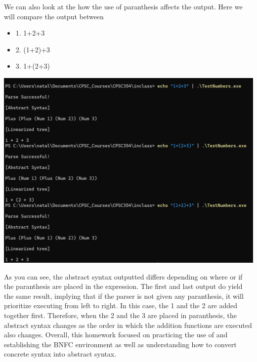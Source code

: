 \documentclass{article}
\theoremstyle{theorem}
\theoremstyle{definition}
\theoremstyle{remark}
\begin{document}
We can also look at the how the use of paranthesis affects the output. Here we will compare the output between 
\begin{center}
  \begin{itemize}
    \item[\ding{99}] 1. 1+2+3
    \item[\ding{99}] 2. (1+2)+3
    \item[\ding{99}] 3. 1+(2+3)
  \end{itemize}


  \includegraphics[width=15cm]{bnfc_exercise1f.png}
\end{center}
As you can see, the abstract syntax outputted differs depending on where or if the paranthesis are placed in the expression. The first and last output do yield the same result, implying 
that if the parser is not given any paranthesis, it will prioritize executing from left to right. In this case, the 1 and the 2 are added together first. Therefore, when the 2 and the 3 are 
placed in paranthesis, the abstract syntax changes as the order in which the addition functions are executed also changes. Overall, this homework focused on practicing the use of and establishing the BNFC 
environment as well as understanding how to convert concrete syntax into abstract syntax. \\
\end{document}
